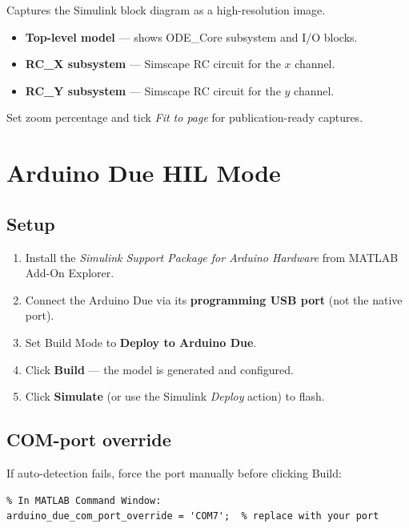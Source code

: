 \documentclass[12pt,a4paper]{article}
\begin{document}
Captures the Simulink block diagram as a high-resolution image.

\begin{itemize}[noitemsep]
  \item \textbf{Top-level model} — shows ODE\_Core subsystem and I/O blocks.
  \item \textbf{RC\_X subsystem} — Simscape RC circuit for the $x$ channel.
  \item \textbf{RC\_Y subsystem} — Simscape RC circuit for the $y$ channel.
\end{itemize}

Set zoom percentage and tick \textit{Fit to page} for publication-ready captures.

\section{Arduino Due HIL Mode}

\subsection{Setup}

\begin{enumerate}
  \item Install the \textit{Simulink Support Package for Arduino Hardware} from MATLAB Add-On Explorer.
  \item Connect the Arduino Due via its \textbf{programming USB port} (not the native port).
  \item Set Build Mode to \textbf{Deploy to Arduino Due}.
  \item Click \textbf{Build} — the model is generated and configured.
  \item Click \textbf{Simulate} (or use the Simulink \textit{Deploy} action) to flash.
\end{enumerate}

\subsection{COM-port override}

If auto-detection fails, force the port manually before clicking Build:

\begin{lstlisting}
% In MATLAB Command Window:
arduino_due_com_port_override = 'COM7';  % replace with your port
\end{lstlisting}
\end{document}
